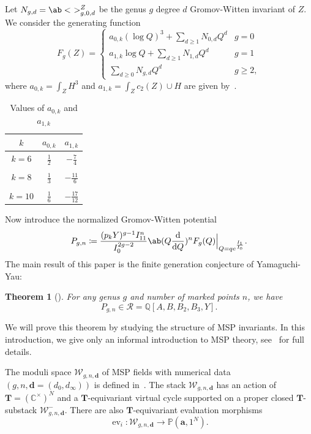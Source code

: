 \documentclass[10pt]{amsart}
\newtheorem{thm}{Theorem}[section]
\theoremstyle{definition}
\theoremstyle{remark}
\theoremstyle{plain}
\theoremstyle{definition}
\theoremstyle{remark}
\newcommand{\C}{\mathbb{C}}
\newcommand{\Q}{\mathbb{Q}}
\newcommand{\bd}{\mathbf{d}}
\newcommand{\ba}{\mathbf{a}}
\renewcommand{\P}{\mathbb{P}}
\newcommand{\msc}[1]{\mathscr{#1}}
\newcommand{\T}{\mathbf{T}}
\newcommand{\1}{\mathbf{1}}
\newcommand{\2}{\mathbf{2}}
\newcommand{\3}{\mathbf{3}}
\DeclareMathOperator{\ev}{ev}
\numberwithin{equation}{section}
\begin{document}
Let $N_{g,d} = \ab<\ >_{g,0,d}^Z$ be the genus $g$ degree $d$ Gromov-Witten invariant of $Z$. We consider the generating function
\[ F_g(Z) = \begin{cases}
    a_{0,k} (\log Q)^3 + \sum_{d \geq 1} N_{0,d} Q^d & g=0 \\
    a_{1,k} \log Q + \sum_{d \geq 1} N_{1,d} Q^d & g=1 \\
    \sum_{d \geq 0} N_{g,d} Q^d & g\geq 2 ,
\end{cases}
\]
where $a_{0,k} = \int_Z H^3$ and $a_{1,k} = \int_Z c_2(Z) \cup H$ are given by~.
\begin{table}[htpb]
    \centering
    \caption{Values of $a_{0,k}$ and $a_{1,k}$}
    \label{tab:label}
    \begin{tabular}{ccc}
        \toprule
        $k$ & $a_{0,k}$ & $a_{1,k}$ \\
        \midrule 
        $k=6$ & $\frac{1}{2}$ & $-\frac{7}{4}$ \\
        \\[-0.8em]
        $k=8$ & $\frac{1}{3}$ & $-\frac{11}{6}$ \\
        \\[-0.8em]
        $k=10$ & $\frac{1}{6}$ & $-\frac{17}{12}$ \\
        \bottomrule
    \end{tabular}
\end{table}
Now introduce the normalized Gromov-Witten potential
\[ P_{g,n} \coloneqq \frac{(p_k Y)^{g-1} I_{11}^n}{I_0^{2g-2}} \ab(Q \odv{}{Q})^n F_g(Q) \Big\vert_{Q = qe^{\frac{I_1}{I_0}}}. \]
The main result of this paper is the finite generation conjecture of Yamaguchi-Yau:

\begin{thm}[]\label{thm:intropoly}
    For any genus $g$ and number of marked points $n$, we have
    \[ P_{g,n} \in \msc{R} = \Q[A,B,B_2, B_3, Y]. \]
\end{thm}

We will prove this theorem by studying the structure of MSP invariants. In this introduction, we give only an informal introduction to MSP theory, see~ for full details.

The moduli space $\msc{W}_{g,n,\bd}$ of MSP fields with numerical data $(g,n,\bd = (d_0, d_{\infty}))$ is defined in~. The stack $\msc{W}_{g,n,\bd}$ has an action of $\T = (\C^{\times})^N$ and a $\T$-equivariant virtual cycle supported on a proper closed $\T$-substack $\msc{W}_{g,n,\bd}^-$. There are also $\T$-equivariant evaluation morphisms
\[ \ev_i \colon \msc{W}_{g,n,\bd} \to \P(\ba, 1^N). \]
\end{document}
